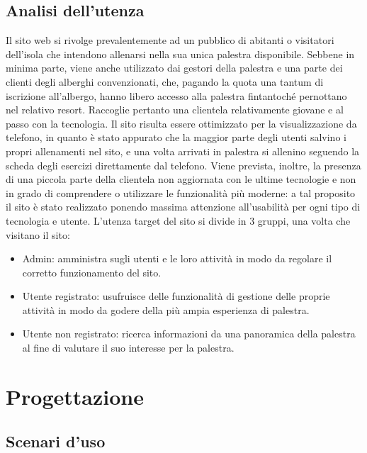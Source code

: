\documentclass[a4paper]{article}
\begin{document}
	\subsection{Analisi dell'utenza}
	Il sito web si rivolge prevalentemente ad un pubblico di abitanti o visitatori dell'isola che intendono allenarsi nella sua unica palestra disponibile. Sebbene in minima parte, viene anche utilizzato dai gestori della palestra e una parte dei clienti degli alberghi convenzionati, che, pagando la quota una tantum di iscrizione all'albergo, hanno libero accesso alla palestra fintantoché pernottano nel relativo resort. Raccoglie pertanto una clientela relativamente giovane e al passo con la tecnologia. Il sito risulta essere ottimizzato per la visualizzazione da telefono, in quanto è stato appurato che la maggior parte degli utenti salvino i propri allenamenti nel sito, e una volta arrivati in palestra si allenino seguendo la scheda degli esercizi direttamente dal telefono. Viene prevista, inoltre, la presenza di una piccola parte della clientela non aggiornata con le ultime tecnologie e non in grado di comprendere o utilizzare le funzionalità più moderne: a tal proposito il sito è stato realizzato ponendo massima attenzione all'usabilità per ogni tipo di tecnologia e utente. L'utenza target del sito si divide in 3 gruppi, una volta che visitano il sito:
	\begin{itemize}
		\item Admin: amministra sugli utenti e le loro attività in modo da regolare il corretto funzionamento del sito.
		\item Utente registrato: usufruisce delle funzionalità di gestione delle proprie attività in modo da godere della più ampia esperienza di palestra.
		\item Utente non registrato: ricerca informazioni da una panoramica della palestra al fine di valutare il suo interesse per la palestra.
		
	\end{itemize}

	\section{Progettazione}

	\subsection{Scenari d'uso}
\end{document}
